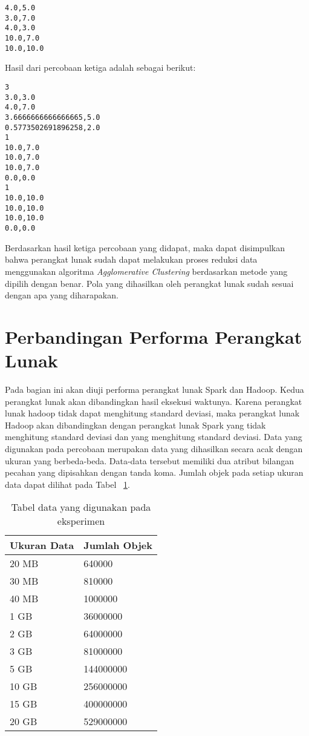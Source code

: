 \begin{itemize}
\begin{verbatim}
4.0,5.0
3.0,7.0
4.0,3.0
10.0,7.0
10.0,10.0
\end{verbatim}

Hasil dari percobaan ketiga adalah sebagai berikut:

\begin{verbatim}
3
3.0,3.0
4.0,7.0
3.6666666666666665,5.0
0.5773502691896258,2.0
1
10.0,7.0
10.0,7.0
10.0,7.0
0.0,0.0
1
10.0,10.0
10.0,10.0
10.0,10.0
0.0,0.0
\end{verbatim}

 
\end{itemize}

Berdasarkan hasil ketiga percobaan yang didapat, maka dapat disimpulkan bahwa perangkat lunak sudah dapat melakukan proses reduksi data menggunakan algoritma \textit{Agglomerative Clustering} berdasarkan metode yang dipilih dengan benar. Pola yang dihasilkan oleh perangkat lunak sudah sesuai dengan apa yang diharapakan.

\section{Perbandingan Performa Perangkat Lunak}

Pada bagian ini akan diuji performa perangkat lunak Spark dan Hadoop. Kedua perangkat lunak akan dibandingkan hasil eksekusi waktunya. Karena perangkat lunak hadoop tidak dapat menghitung standard deviasi, maka perangkat lunak Hadoop akan dibandingkan dengan perangkat lunak Spark yang tidak menghitung standard deviasi dan yang menghitung standard deviasi. Data yang digunakan pada percobaan merupakan data yang dihasilkan secara acak dengan ukuran yang berbeda-beda. Data-data tersebut memiliki dua atribut bilangan pecahan yang dipisahkan dengan tanda koma. Jumlah objek pada setiap ukuran data dapat dilihat pada Tabel ~\ref{tab:exdata}.\\

\begin{table}[H] 
	\centering 
	\caption{Tabel data yang digunakan pada eksperimen}
	\label{tab:exdata}
	\begin{tabular}{|p{2cm}|p{4cm}|}
\hline
Ukuran Data & Jumlah Objek  \\
\hline
20 MB & 640000 \\
\hline
30 MB & 810000 \\
\hline
40 MB & 1000000 \\
\hline
1 GB & 36000000 \\
\hline
2 GB & 64000000 \\
\hline
3 GB & 81000000 \\
\hline
5 GB & 144000000 \\
\hline
10 GB & 256000000 \\
\hline
15 GB & 400000000 \\
\hline
20 GB & 529000000 \\
\hline
	\end{tabular} 
\end{table}



